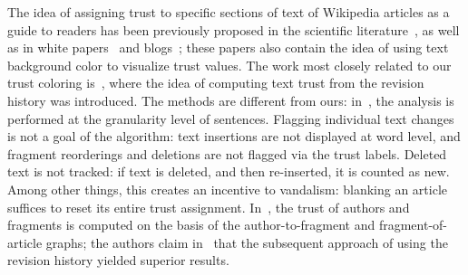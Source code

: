 The idea of assigning trust to specific sections of text of Wikipedia
articles as a guide to readers has been previously proposed in the scientific
literature~\cite{WikiMTWtrust06,Cr06,McGuinness06}, as well as in white
papers~\cite{King07} and blogs~\cite{PaoloMassa07}; these papers also contain
the idea of using text background color to visualize trust values.
The work most closely related to our trust coloring is~\cite{McGuinness06},
where the idea of computing text trust from the
revision history was introduced.
The methods are different from ours:
in~\cite{McGuinness06}, the analysis is performed at the granularity
level of sentences.
Flagging individual text changes is not a goal of the algorithm: text
insertions are not displayed at word level, and fragment reorderings
and deletions are not flagged via the trust labels.
Deleted text is not tracked: if text is deleted, and then re-inserted,
it is counted as new.
Among other things, this creates an incentive to vandalism:
blanking an article suffices to reset its entire trust assignment.
In~\cite{WikiMTWtrust06}, the trust of authors and fragments is
computed on the basis of the author-to-fragment and
fragment-of-article graphs; the authors claim in~\cite{McGuinness06}
that the subsequent approach of using the revision history yielded
superior results.

